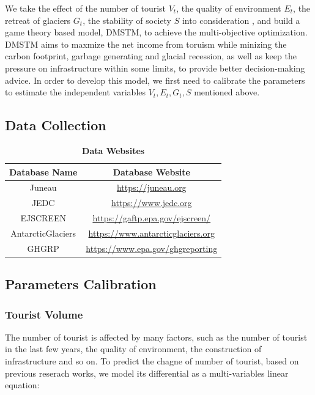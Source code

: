 \documentclass{mcmthesis}
\begin{document}
We take the effect of the number of tourist $V_t$, the quality of environment $E_t$, 
the retreat of glaciers $G_t$, the stability of society $S$ into consideration , 
and build a game theory based model\cite{Wang2021}, DMSTM, to achieve the multi-objective optimization.
DMSTM aims to maxmize the net income from toruism while minizing the carbon footprint,
garbage generating and glacial recession, as well as keep the pressure on infrastructure within some limits,
to provide better decision-making advice.
In order to develop this model, we first need to calibrate the parameters to estimate 
the independent variables $V_t, E_t, G_t, S$ mentioned above.

\subsection{Data Collection}
\begin{table}[H]
  \caption{\textbf{Data Websites}} 
  \centering
  \begin{tabular}{cc}
    \toprule 
      Database Name & Database Website \\
    \midrule
      Juneau & \href{https://juneau.org}{https://juneau.org} \\ 
      JEDC & \href{https://www.jedc.org}{https://www.jedc.org} \\
      EJSCREEN & \href{https://gaftp.epa.gov/ejscreen/}{https://gaftp.epa.gov/ejscreen/} \\ 
      AntarcticGlaciers & \href{https://www.antarcticglaciers.org}{https://www.antarcticglaciers.org} \\
      GHGRP & \href{https://www.epa.gov/ghgreporting}{https://www.epa.gov/ghgreporting} \\
    \bottomrule
  \end{tabular}
\end{table}

\subsection{Parameters Calibration}

\subsubsection{Tourist Volume}
The number of tourist is affected by many factors, such as the number of tourist in the last few years, 
the quality of environment, the construction of infrastructure and so on. To predict the chagne of number of tourist,
based on previous reserach works\cite{johnston2005dynamic}, we model its differential as a multi-variables linear equation:
\end{document}
